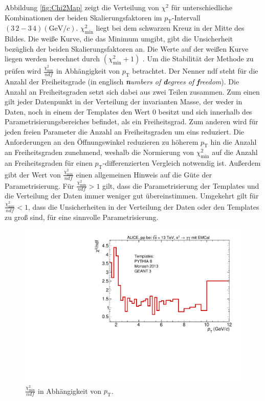 \newline
Abbildung \ref{fig:Chi2Map} zeigt die Verteilung von $\chi^{2}$ für unterschiedliche Kombinationen der beiden Skalierungsfaktoren im $p_{\text{T}}$-Intervall $(3\,2 - 3\,4)(\text{GeV}/c)$.
$\chi^{2}_\text{min}$ liegt bei dem schwarzen Kreuz in der Mitte des Bildes.
Die weiße Kurve, die das Minimum umgibt, gibt die Unsicherheit bezüglich der beiden Skalierungsfaktoren an.
Die Werte auf der weißen Kurve liegen werden berechnet durch $\left(\chi^{2}_\text{min}+1\right)$ \cite{book:chi2}.
\newline
Um die Stabilität der Methode zu prüfen wird $\frac{\chi^{2}_\text{min}}{ndf}$ in Abhängigkeit von $p_{\text{T}}$ betrachtet.
Der Nenner ndf steht für die Anzahl der Freiheitsgrade (in englisch \textit{\textbf{n}umbers of \textbf{d}egrees of \textbf{f}reedom}).
Die Anzahl an Freiheitsgraden setzt sich dabei aus zwei Teilen zusammen.
Zum einen gilt jeder Datenpunkt in der Verteilung der invarianten Masse, der weder in Daten, noch in einem der Templates den Wert 0 besitzt und sich innerhalb des Parametrisierungsbereiches befindet, als ein Freiheitsgrad.
Zum anderen wird für jeden freien Parameter die Anzahl an Freiheitsgraden um eins reduziert.
Die Anforderungen an den Öffnungswinkel reduzieren zu höherem $p_{\text{T}}$ hin die Anzahl an Freiheitsgraden zunehmend, weshalb die Normierung von $\chi^{2}_\text{min}$ auf die Anzahl an Freiheitsgraden für einen $p_{\text{T}}$-differenzierten Vergleich notwendig ist.
Außerdem gibt der Wert von $\frac{\chi^{2}_\text{min}}{ndf}$ einen allgemeinen Hinweis auf die Güte der Parametrisierung.
Für $\frac{\chi^{2}_\text{min}}{ndf} > 1$ gilt, dass die Parametrisierung der Templates und die Verteilung der Daten immer weniger gut übereinstimmen.
Umgekehrt gilt für $\frac{\chi^{2}_\text{min}}{ndf} < 1$, dass die Unsicherheiten in der Verteilung der Daten oder den Templates zu groß sind, für eine sinnvolle Parametrisierung.
\begin{figure}[tp]
\centering
\includegraphics[width=.65\linewidth]{Chi2NoComp_Data_2016.pdf}
\caption{$\frac{\chi^{2}_\text{min}}{ndf}$ in Abhängigkeit von $p_{\text{T}}$.
}
\label{fig:Chi2pT}
\end{figure}
